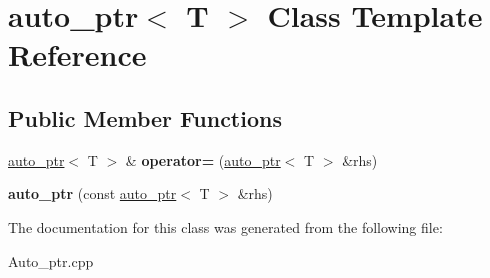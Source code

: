 \hypertarget{classauto__ptr}{}\section{auto\+\_\+ptr$<$ T $>$ Class Template Reference}
\label{classauto__ptr}
\subsection*{Public Member Functions}
\begin{DoxyCompactItemize}
\item 
\hyperlink{classauto__ptr}{auto\+\_\+ptr}$<$ T $>$ \& {\bfseries operator=} (\hyperlink{classauto__ptr}{auto\+\_\+ptr}$<$ T $>$ \&rhs)\hypertarget{classauto__ptr_a4a4403ec92560f2f18cc5f8e5c3d9c3a}{}\label{classauto__ptr_a4a4403ec92560f2f18cc5f8e5c3d9c3a}

\item 
{\bfseries auto\+\_\+ptr} (const \hyperlink{classauto__ptr}{auto\+\_\+ptr}$<$ T $>$ \&rhs)\hypertarget{classauto__ptr_a95125c834bc675108a229f0ec64c6efb}{}\label{classauto__ptr_a95125c834bc675108a229f0ec64c6efb}

\end{DoxyCompactItemize}


The documentation for this class was generated from the following file\+:\begin{DoxyCompactItemize}
\item 
Auto\+\_\+ptr.\+cpp\end{DoxyCompactItemize}

